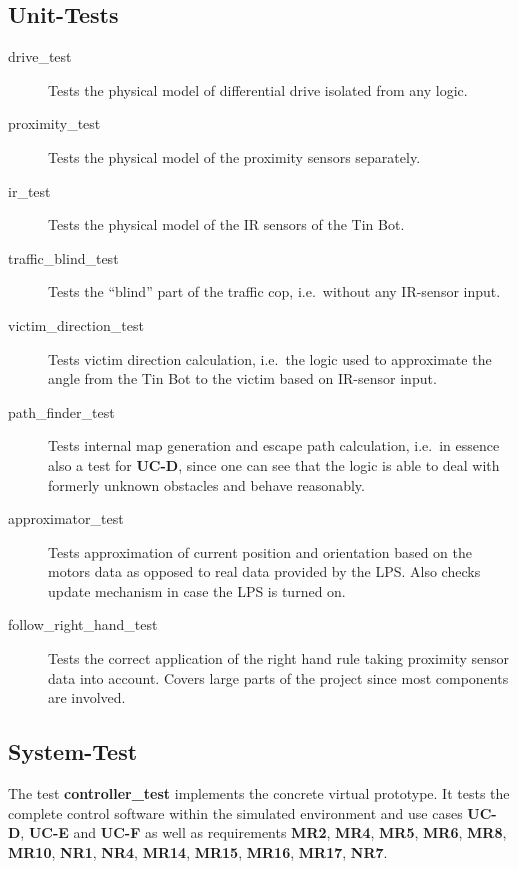 \documentclass[a4paper,parskip,headheight=38pt]{scrartcl} %
\begin{document}
\subsection{Unit-Tests}
\begin{description}
\item[drive\_test] Tests the physical model of differential drive isolated from any logic.
\item[proximity\_test] Tests the physical model of the proximity sensors separately. %
\item[ir\_test] Tests the physical model of the IR sensors of the Tin Bot.
\item[traffic\_blind\_test] Tests the \enquote{blind} part of the traffic cop, i.e.\ without any IR-sensor input.
\item[victim\_direction\_test] Tests victim direction calculation, i.e.\ the logic used to approximate the angle from the Tin Bot to the victim based on IR-sensor input.
\item[path\_finder\_test] Tests internal map generation and escape path calculation, i.e.\ in essence also a test for \textbf{UC-D}, since one can see that the logic is able to deal with formerly unknown obstacles and behave reasonably.
\item[approximator\_test] Tests approximation of current position and orientation based on the motors data as opposed to real data provided by the LPS. Also checks update mechanism in case the LPS is turned on.
\item[follow\_right\_hand\_test] Tests the correct application of the right hand rule taking proximity sensor data into account. Covers large parts of the project since most components are involved.
\end{description}

\subsection{System-Test}
The test \textbf{controller\_test} implements the concrete virtual prototype. It tests the complete control software within the simulated environment and use cases \textbf{UC-D}, \textbf{UC-E} and \textbf{UC-F} as well as requirements \textbf{MR2}, \textbf{MR4}, \textbf{MR5}, \textbf{MR6}, \textbf{MR8}, \textbf{MR10}, \textbf{NR1}, \textbf{NR4}, \textbf{MR14}, \textbf{MR15}, \textbf{MR16}, \textbf{MR17}, \textbf{NR7}. 

\end{document}
